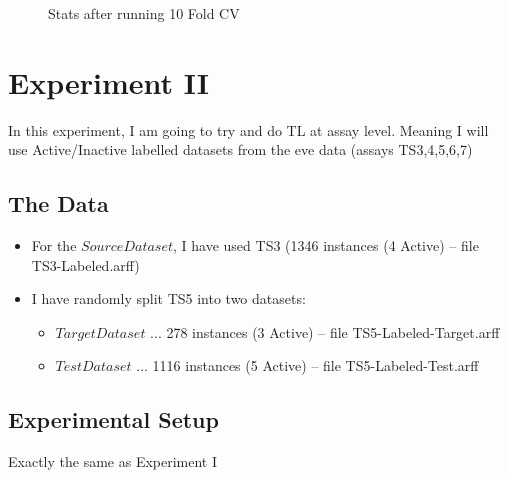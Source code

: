 \documentclass[a4paper,12pt, english]{article}
\begin{document}
\begin{figure}[htp]
\begin{center}
  \end{center}
  \caption{Stats after running 10 Fold CV}
  \label{fig:stats1}
\end{figure}

\newpage


\section{Experiment II}
In this experiment, I am going to try and do TL at assay level. Meaning I will use Active/Inactive labelled datasets from the eve data (assays TS3,4,5,6,7)
\subsection{The Data}
\begin{itemize}
\item For the $Source Dataset$, I have used TS3 (1346 instances (4 Active) -- file TS3-Labeled.arff)
\item I have randomly split TS5 into two datasets:
\begin{itemize}
\item $Target Dataset$ ... 278 instances (3 Active) -- file TS5-Labeled-Target.arff
\item $Test Dataset$ ... 1116 instances (5 Active) -- file TS5-Labeled-Test.arff
\end{itemize}
\end{itemize}  

\subsection{Experimental Setup}
Exactly the same as Experiment I
\end{document}
